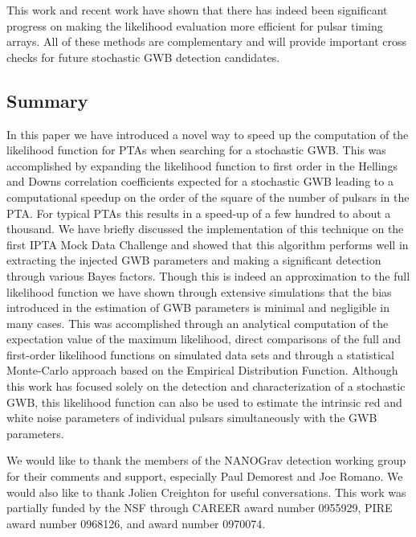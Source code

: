 \documentclass[iop]{emulateapj}
\begin{document}
This work and recent work have shown that there has indeed been significant progress on making the likelihood evaluation more efficient for pulsar timing arrays. All of these methods are complementary and will provide important cross checks for future stochastic GWB detection candidates.

\subsection{Summary}

In this paper we have introduced a novel way to speed up the computation of the likelihood function for PTAs when searching for a stochastic GWB. This was accomplished by expanding the likelihood function to first order in the Hellings and Downs correlation coefficients expected for a stochastic GWB leading to a computational speedup on the order of the square of the number of pulsars in the PTA. For typical PTAs this results in a speed-up of a few hundred to about a thousand. We have briefly discussed the implementation of this technique on the first IPTA Mock Data Challenge and showed that this algorithm performs well in extracting the injected GWB parameters and making a significant detection through various Bayes factors. Though this is indeed an approximation to the full likelihood function we have shown through extensive simulations that the bias introduced in the estimation of GWB parameters is minimal and negligible in many cases. This was accomplished through an analytical computation of the expectation value of the maximum likelihood, direct comparisons of the full and first-order likelihood functions on simulated data sets and through a statistical Monte-Carlo approach based on the Empirical Distribution Function. Although this work has focused solely on the detection and characterization of a stochastic GWB, this likelihood function can also be used to estimate the intrinsic red and white noise parameters of individual pulsars simultaneously with the GWB parameters. 

\acknowledgements
We would like to thank the members of the NANOGrav detection working group for their comments and support, especially Paul Demorest and Joe Romano. We would also like to thank Jolien Creighton for useful conversations. This work was partially funded by the NSF through CAREER award number 0955929, PIRE award number 0968126, and award number 0970074.

\appendix
\end{document}
